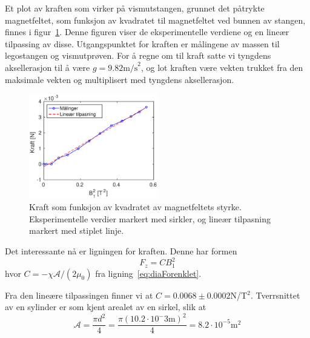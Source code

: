 \documentclass[a4paper,11pt, twocolumn]{article}
\begin{document}
Et plot av kraften som virker på vismutstangen, grunnet det påtrykte magnetfeltet, som funksjon av kvadratet til magnetfeltet ved bunnen av stangen, finnes i figur~\ref{fig:lintilpass}. Denne figuren viser de eksperimentelle verdiene og en lineær tilpassing av disse. Utgangspunktet for kraften er målingene av massen til legostangen og vismutprøven. For å regne om til kraft satte vi tyngdens aksellerasjon til å være $g=9.82\text{m/s}^2$, og lot kraften være vekten trukket fra den maksimale vekten og multiplisert med tyngdens aksellerasjon.

\begin{figure}[!ht]
	\centering
	\includegraphics[width = 0.5\textwidth]{matlab/tilpasning.eps}
	\caption{Kraft som funksjon av kvadratet av magnetfeltets styrke. Eksperimentelle verdier markert med sirkler, og lineær tilpasning markert med stiplet linje.}
	\label{fig:lintilpass}
\end{figure}
Det interessante nå er ligningen for kraften. Denne har formen
\begin{equation}
	F_z = CB_1^2
	\label{eq:linear}
\end{equation}
hvor $C=-\chi\mathcal{A}/(2\mu_0)$ fra ligning~\eqref{eq:diaForenklet}.

Fra den lineære tilpassingen finner vi at $C = 0.0068\pm0.0002$N/T$^2$. Tverrsnittet av en sylinder er som kjent arealet av en sirkel, slik at
\begin{equation}
	\mathcal{A} = \frac{\pi d^2}{4}=\frac{\pi (10.2\cdot10^-3\text{m})^2}{4}=8.2\cdot10^{-5}\text{m}^2
	\label{eq:area}
\end{equation}
\end{document}
